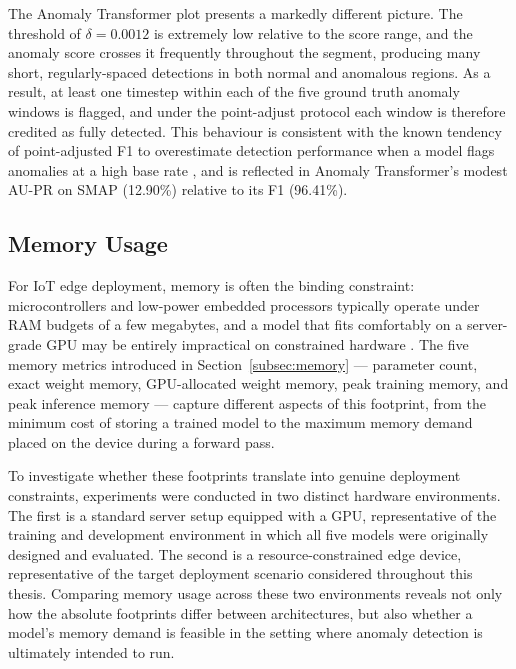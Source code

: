 \documentclass[twoside,11pt,openright]{report}
\begin{document}
The Anomaly Transformer plot presents a markedly different picture. The threshold 
of $\delta = 0.0012$ is extremely low relative to the score range, and the 
anomaly score crosses it frequently throughout the segment, producing many short, 
regularly-spaced detections in both normal and anomalous regions. As a result, 
at least one timestep within each of the five ground truth anomaly windows is 
flagged, and under the point-adjust protocol each window is therefore credited 
as fully detected. This behaviour is consistent with the known tendency of 
point-adjusted F1 to overestimate detection performance when a model flags 
anomalies at a high base rate \citep{darban2024carla}, and is reflected in 
Anomaly Transformer's modest AU-PR on SMAP (12.90\%) relative to its F1 
(96.41\%).



\subsection{Memory Usage}

For IoT edge deployment, memory is often the 
binding constraint: microcontrollers and low-power embedded processors typically operate under 
RAM budgets of a few megabytes, and a model that fits comfortably on a server-grade GPU may 
be entirely impractical on constrained hardware \citep{wang2025optimizing}. The five memory 
metrics introduced in Section~\ref{subsec:memory} --- parameter count, exact weight memory, 
GPU-allocated weight memory, peak training memory, and peak inference memory --- capture 
different aspects of this footprint, from the minimum cost of storing a trained model to the 
maximum memory demand placed on the device during a forward pass.

To investigate whether these footprints translate into genuine deployment constraints, 
experiments were conducted in two distinct hardware environments. The first is a standard 
server setup equipped with a GPU, representative of the training and development environment 
in which all five models were originally designed and evaluated. The second is a resource-constrained 
edge device, representative of the target deployment scenario considered throughout this thesis. 
Comparing memory usage across these two environments reveals not only how the absolute footprints 
differ between architectures, but also whether a model's memory demand is feasible in the 
setting where anomaly detection is ultimately intended to run.
\end{document}
